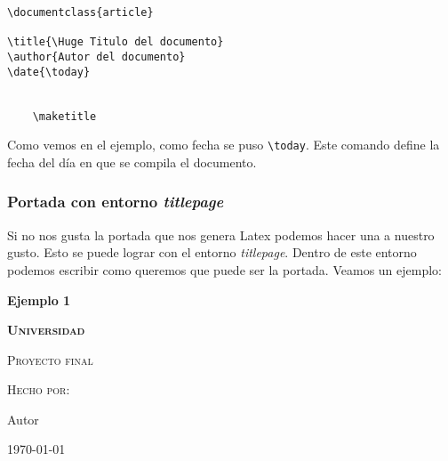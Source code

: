 	\begin{myquote}
		\begin{lstlisting}
\documentclass{article}

\title{\Huge Titulo del documento}
\author{Autor del documento}
\date{\today}


	\maketitle

		\end{lstlisting}
	\end{myquote}
	
	
	Como vemos en el ejemplo, como fecha se puso \verb|\today|. Este comando define la fecha del día en que se compila el documento.
	
	\subsubsection{Portada con entorno \textit{titlepage}}
	
	Si no nos gusta la portada que nos genera Latex podemos hacer una a nuestro gusto. Esto se puede lograr con el entorno \textit{titlepage}. Dentro de este entorno podemos escribir como queremos que puede ser la portada. Veamos un ejemplo:
	
	\textbf{Ejemplo 1}
	
	\begin{center}
		\colorbox{light-yellow}{
			\begin{minipage}{\textwidth}
				\centering
				\vspace{50pt}
				{\scshape\Huge \textbf{Universidad}}
				\vspace{100pt}
				
				{\scshape\huge Proyecto final}
				\vspace{80pt}
				
				{\scshape\Large Hecho por:}
				\vspace{10pt} 
				
				{\large Autor}
				\vspace{25pt}
				
				{\large \today}
				\vspace{50pt}
			\end{minipage}
		}
	\end{center}
	

